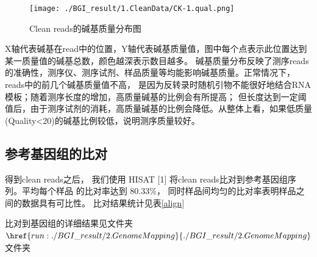 \documentclass[10pt, oneside,a4paper]{article}
\begin{document}
\begin{figure}[H]
\centering
\texttt{[image: ./BGI\_result/1.CleanData/CK-1.qual.png]}
\renewcommand{\figurename}{图}
\caption{Clean reads的碱基质量分布图}
\label{ReadsHeatmap}
\end{figure}
X轴代表碱基在read中的位置，Y轴代表碱基质量值，图中每个点表示此位置达到某一质量值的碱基总数，颜色越深表示数目越多。
碱基质量分布反映了测序reads的准确性，测序仪、测序试剂、样品质量等均能影响碱基质量。正常情况下，reads中的前几个碱基质量值不高，
是因为反转录时随机引物不能很好地结合RNA模板；随着测序长度的增加，高质量碱基的比例会有所提高；
但长度达到一定阈值后，由于测序试剂的消耗，高质量碱基的比例会降低。从整体上看，如果低质量(Quality<20)的碱基比例较低，说明测序质量较好。
\vspace{5 mm}

\subsection{参考基因组的比对}
得到clean reads之后， 我们使用 HISAT [1] 将clean reads比对到参考基因组序列。平均每个样品
的比对率达到 80.33\%， 同时样品间均匀的比对率表明样品之间的数据具有可比性。 比对结果统计见表\ref{align}\par
比对到基因组的详细结果见文件夹$\href{run:./BGI\_result/2.GenomeMapping}{./BGI\_result/2.GenomeMapping}$文件夹\par
\begin{table}[H]
\centering
{}
\end{table}
\par
\vspace{5 mm}
\end{document}
